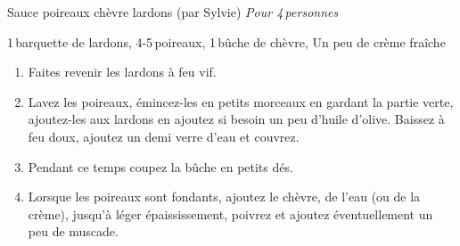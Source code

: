 \begin{recette}{Sauce poireaux chèvre lardons (par Sylvie)}
  \emph{Pour 4\,personnes}
  \begin{ingredients}
    1\,barquette de lardons\sep
    4-5\,poireaux\sep
    1\,bûche de chèvre\sep
    Un peu de crème fraîche 
  \end{ingredients}
	\begin{enumerate}
  \item Faites revenir les lardons à feu vif.
  \item Lavez les poireaux, émincez-les en petits morceaux en gardant la partie verte, ajoutez-les aux lardons en ajoutez si besoin un peu d’huile d’olive. Baissez à feu doux, ajoutez un demi verre d’eau et couvrez.
  \item Pendant ce temps coupez la bûche en petits dés.
  \item Lorsque les poireaux sont fondants, ajoutez le chèvre, de l’eau (ou de la crème), jusqu’à léger épaississement, poivrez et ajoutez éventuellement un peu de muscade.
  \end{enumerate}
\end{recette}
